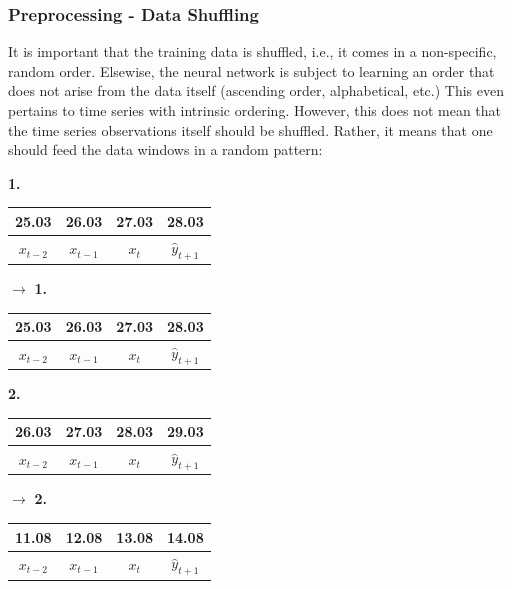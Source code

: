 \documentclass[xcolor=dvipsnames, english, 8pt]{beamer}
\begin{document}
\begin{frame}
    \frametitle{Preprocessing - Data Shuffling}
It is important that the training data is shuffled, i.e., it comes in a non-specific, random order. Elsewise, the neural network is subject to learning an order that does not arise from the data itself (ascending order, alphabetical, etc.) This even pertains to time series with intrinsic ordering. However, this does not mean that the time series observations itself should be shuffled. Rather, it means that one should feed the {\color{ubRed}data windows} in a random pattern:\vspace{0.5cm}\\

\begin{table}[t]
\centering
\textbf{1.} \begin{tabular}{|c|c|c|c|}
\hline
25.03 & 26.03 & 27.03 & 28.03\\
\hline
 {\color{green!50}$x_{t-2}$} & {\color{green!50}$x_{t-1}$} & {\color{green!50}$x_{t}$} & {\color{red!50}$\hat{y}_{t+1}$}\\
\hline
\end{tabular}
\hspace{0.25cm}$\longrightarrow$\hspace{0.25cm}
\textbf{1.} \begin{tabular}{|c|c|c|c|}
\hline
25.03 & 26.03 & 27.03 & 28.03\\
\hline
 {\color{green!50}$x_{t-2}$} & {\color{green!50}$x_{t-1}$} & {\color{green!50}$x_{t}$} & {\color{red!50}$\hat{y}_{t+1}$}\\
\hline
\end{tabular}
\end{table}

\begin{table}[t]
\centering
\textbf{2.} \begin{tabular}{|c|c|c|c|}
\hline
 26.03 & 27.03 & 28.03 & 29.03\\
\hline
 {\color{green!50}$x_{t-2}$} & {\color{green!50}$x_{t-1}$} & {\color{green!50}$x_{t}$} & {\color{red!50}$\hat{y}_{t+1}$}\\
\hline
\end{tabular}
\hspace{0.25cm}$\longrightarrow$\hspace{0.25cm}
\textbf{2.} \begin{tabular}{|c|c|c|c|}
\hline
11.08 & 12.08 & 13.08 & 14.08\\
\hline
 {\color{green!50}$x_{t-2}$} & {\color{green!50}$x_{t-1}$} & {\color{green!50}$x_{t}$} & {\color{red!50}$\hat{y}_{t+1}$}\\
\hline
\end{tabular}
\end{table}




\end{frame}
\end{document}
